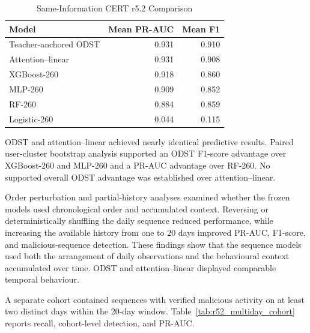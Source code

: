 \begin{table}[!tbp]
\caption{Same-Information CERT r5.2 Comparison}
\label{tab:r52_same_information}
\centering
\footnotesize
\renewcommand{\arraystretch}{1.08}
\setlength{\tabcolsep}{2pt}
\begin{tabular*}{\columnwidth}
{@{\extracolsep{\fill}}lrr@{}}
\hline
\textbf{Model} &
\textbf{Mean PR-AUC} &
\textbf{Mean F1} \\
\hline
Teacher-anchored ODST & 0.931 & 0.910 \\
Attention--linear & 0.931 & 0.908 \\
XGBoost-260 & 0.918 & 0.860 \\
MLP-260 & 0.909 & 0.852 \\
RF-260 & 0.884 & 0.859 \\
Logistic-260 & 0.044 & 0.115 \\
\hline
\end{tabular*}
\end{table}

ODST and attention--linear achieved nearly identical predictive results.
Paired user-cluster bootstrap analysis supported an ODST F1-score advantage
over XGBoost-260 and MLP-260 and a PR-AUC advantage over RF-260. No
supported overall ODST advantage was established over attention--linear.

\smallskip
Order perturbation and partial-history analyses examined whether the frozen
models used chronological order and accumulated context. Reversing or
deterministically shuffling the daily sequence reduced performance, while
increasing the available history from one to 20 days improved PR-AUC,
F1-score, and malicious-sequence detection. These findings show that the
sequence models used both the arrangement of daily observations and the
behavioural context accumulated over time. ODST and attention--linear
displayed comparable temporal behaviour.

\smallskip
A separate cohort contained sequences with verified malicious activity on
at least two distinct days within the 20-day window.
Table~\ref{tab:r52_multiday_cohort} reports recall, cohort-level detection,
and PR-AUC.

